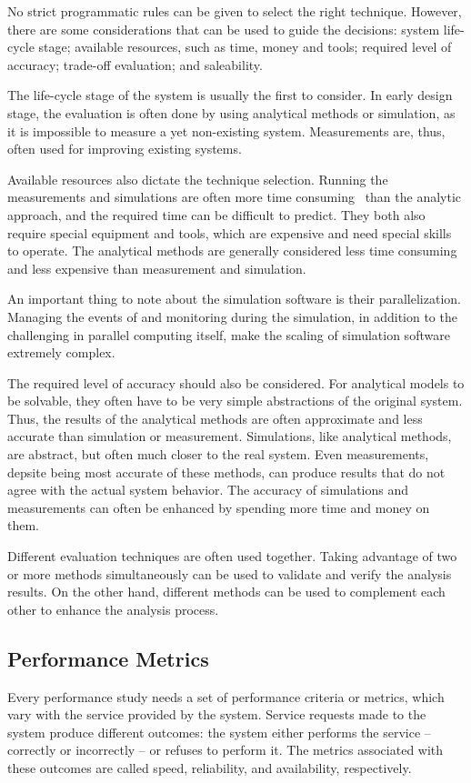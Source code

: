 No strict programmatic rules can be given to select the right technique. However, there are some considerations that can be used to guide the decisions: system life-cycle stage; available resources, such as time, money and tools; required level of accuracy; trade-off evaluation; and saleability.~\cite{jain:1991:AOCSPA}

The life-cycle stage of the system is usually the first to consider. In early design stage, the evaluation is often done by using analytical methods or simulation, as it is impossible to measure a yet non-existing system. Measurements are, thus, often used for improving existing systems.~\cite{jain:1991:AOCSPA}

Available resources also dictate the technique selection. Running the measurements and simulations are often more time consuming~\cite{Fujimoto:1990:PDE} than the analytic approach, and the required time can be difficult to predict. They both also require special equipment and tools, which are expensive and need special skills to operate. The analytical methods are generally considered less time consuming and less expensive than measurement and simulation.~\cite{jain:1991:AOCSPA}

An important thing to note about the simulation software is their parallelization. Managing the events of and monitoring during the simulation, in addition to the challenging in parallel computing itself, make the scaling of simulation software extremely complex.~\cite{Fujimoto:1990:PDE}

The required level of accuracy should also be considered. For analytical models to be solvable, they often have to be very simple abstractions of the original system. Thus, the results of the analytical methods are often approximate and less accurate than simulation or measurement. Simulations, like analytical methods, are abstract, but often much closer to the real system. Even measurements, depsite being most accurate of these methods, can produce results that do not agree with the actual system behavior. The accuracy of simulations and measurements can often be enhanced by spending more time and money on them.~\cite{jain:1991:AOCSPA}

Different evaluation techniques are often used together. Taking advantage of two or more methods simultaneously can be used to validate and verify the analysis results. On the other hand, different methods can be used to complement each other to enhance the analysis process.~\cite{jain:1991:AOCSPA}

\subsection{Performance Metrics}
Every performance study needs a set of performance criteria or metrics, which vary with the service provided by the system. Service requests made to the system produce different outcomes: the system either performs the service -- correctly or incorrectly -- or refuses to perform it. The metrics associated with these outcomes are called speed, reliability, and availability, respectively.~\cite{jain:1991:AOCSPA}

